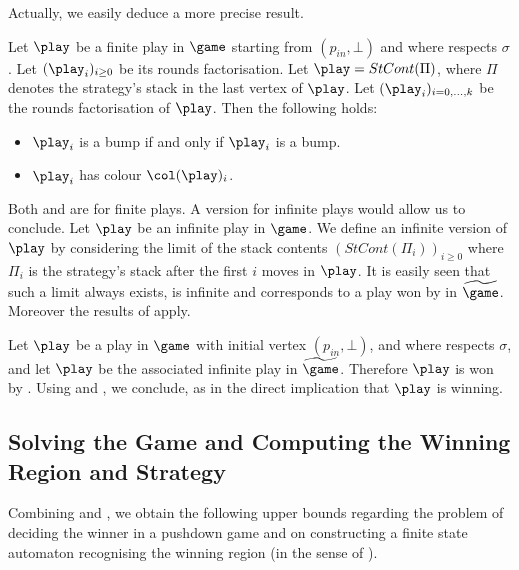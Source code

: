 Actually, we easily deduce a more precise result.

\begin{lemma}\label{11-lemme:toto_paritexp}
Let $\play$ be a finite play in $\game$ starting from
$(p_{in},\bot)$ and where \Eve respects $\sigma$. Let $(\play_i)_{i\geq 0}$ be its rounds factorisation. Let
$\play=StCont(\Pi)$, where $\Pi$ denotes the strategy's
stack in the last vertex of $\play$. Let
$(\play_i)_{i=0,\dots,k}$ be the rounds factorisation of $\play$.
Then the following holds:
\begin{itemize}
\item $\play_i$ is a bump if and only if ${\play}_i$ is a bump.

\item $\play_i$ has colour $\pdscol{\play}_i$.
\end{itemize}
\end{lemma}

Both  and
 are for finite plays. A version for
infinite plays would allow us to conclude. Let $\play$
be an infinite play in $\game$. We define an
infinite version of $\play$ by considering the limit of the stack
contents $(StCont(\Pi_i))_{i\geq 0}$ where $\Pi_i$ is the
strategy's stack after the first $i$ moves in $\play$. %
It is easily seen that such a limit
always exists, is infinite and corresponds to a play won by \Eve in $\fgame$.
Moreover the results of  apply.


Let $\play$ be a play in $\game$ with initial
vertex $(p_{in},\bot)$, and where \Eve respects $\sigma$,
and let $\play$ be the associated infinite play in $\fgame$.
Therefore $\play$ is won by \Eve. Using  and ,
we conclude, as in the direct implication that $\play$ is
winning.


\subsection{Solving the Game and Computing the Winning Region and Strategy}
\label{11-section:computing-all}

Combining  and , we obtain the following upper bounds regarding the problem of deciding the winner in a pushdown game and on constructing a finite state automaton recognising the winning region (in the sense of ).

